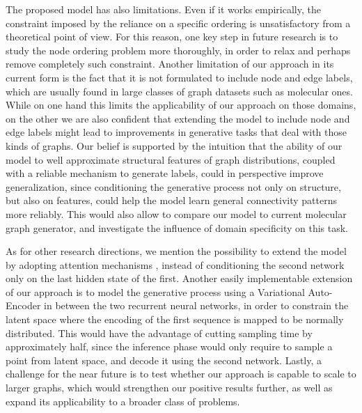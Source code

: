 The proposed model has also limitations. Even if it works empirically, the constraint imposed by the reliance on a specific ordering is unsatisfactory from a theoretical point of view. For this reason, one key step in future research is to study the node ordering problem more thoroughly, in order to relax and perhaps remove completely such constraint. Another limitation of our approach in its current form is the fact that it is not formulated to include node and edge labels, which are usually found in large classes of graph datasets such as molecular ones. While on one hand this limits the applicability of our approach on those domains, on the other we are also confident that extending the model to include node and edge labels might lead to improvements in generative tasks that deal with those kinds of graphs. Our belief is supported by the intuition that the ability of our model to well approximate structural features of graph distributions, coupled with a reliable mechanism to generate labels, could in perspective improve generalization, since conditioning the generative process not only on structure, but also on features, could help the model learn general connectivity patterns more reliably. This would also allow to compare our model to current molecular graph generator, and investigate the influence of domain specificity on this task.

As for other research directions, we mention the possibility to extend the model by adopting attention mechanisms \citep{bahdanau2015attention}, instead of conditioning the second network only on the last hidden state of the first. Another easily implementable extension of our approach is to model the generative process using a Variational Auto-Encoder in between the two recurrent neural networks, in order to constrain the latent space where the encoding of the first sequence is mapped to be normally distributed. This would have the advantage of cutting sampling time by approximately half, since the inference phase would only require to sample a point from latent space, and decode it using the second network. Lastly, a challenge for the near future is to test whether our approach is capable to scale to larger graphs, which would strengthen our positive results further, as well as expand its applicability to a broader class of problems.
